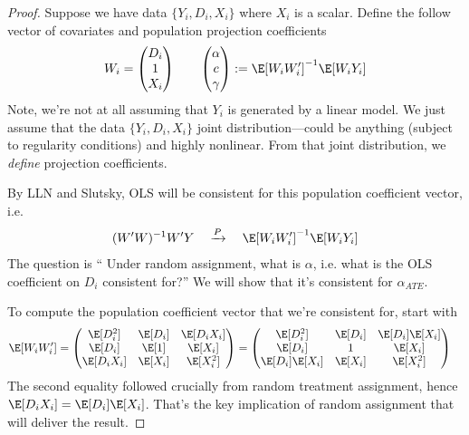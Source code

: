 \documentclass[12pt]{article}
\theoremstyle{plain}
\theoremstyle{definition}
\theoremstyle{remark}
\newcommand{\pto}{\xrightarrow{P}}
\begin{document}
\begin{proof}
Suppose we have data $\{Y_i,D_i,X_i\}$ where $X_i$ is a scalar.
Define the follow vector of covariates and population projection
coefficients
\begin{align*}
  W_i =
  \begin{pmatrix}
    D_i \\
    1 \\
    X_i
  \end{pmatrix}
  \qquad
  \begin{pmatrix}
    \alpha \\
    c \\
    \gamma
  \end{pmatrix}
  :=
  \E[W_iW_i']^{-1}
  \E[W_iY_i]
\end{align*}
Note, we're not at all assuming that $Y_i$ is generated by a linear
model. We just assume that the data $\{Y_i,D_i,X_i\}$ joint
distribution---could be anything (subject to regularity conditions)
and highly nonlinear.
From that joint distribution, we \emph{define} projection
coefficients.

By LLN and Slutsky, OLS will be consistent for this population
coefficient vector, i.e.
\begin{align*}
  (W'W)^{-1}W'Y
  \quad\pto\quad
  \E[W_iW_i']^{-1}
  \E[W_iY_i]
\end{align*}
The question is `` Under random assignment, what is $\alpha$, i.e.
what is the OLS coefficient on $D_i$ consistent for?''
We will show that it's consistent for $\alpha_{ATE}$.

To compute the population coefficient vector that we're consistent
for, start with
\begin{align*}
  \E[W_iW_i']
  &=
  \begin{pmatrix}
    \E[D_i^2 ] & \E[D_i] & \E[D_i X_i] \\
    \E[D_i   ] & \E[1  ] & \E[X_i    ] \\
    \E[D_iX_i] & \E[X_i] & \E[X_i^2]
  \end{pmatrix}
  =
  \begin{pmatrix}
    \E[D_i^2 ]     & \E[D_i] & \E[D_i] \E[X_i] \\
    \E[D_i   ]     & 1       & \E[X_i] \\
    \E[D_i]\E[X_i] & \E[X_i] & \E[X_i^2]
  \end{pmatrix}
\end{align*}
The second equality followed crucially from random treatment
assignment,
hence $\E[D_iX_i]=\E[D_i]\E[X_i]$.
That's the key implication of random assignment that will deliver the
result.


\end{proof}
\end{document}
